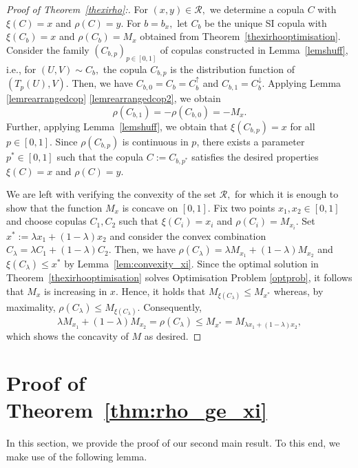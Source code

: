 \documentclass{article}
\theoremstyle{plain}
\theoremstyle{definition}
\begin{document}
\begin{proof}[Proof of Theorem~\ref{thexirho}:]
For \((x,y)\in \mathcal{R},\) we determine a copula \(C\) with \(\xi(C) = x\) and \(\rho(C) = y.\)
For \(b = b_x,\) let \(C_{b}\) be the unique SI copula with \(\xi(C_b) =  x\) and \(\rho(C_b) = M_x\) obtained from Theorem~\ref{thexirhooptimisation}.
Consider the family \((C_{b,p})_{p\in [0,1]}\) of copulas constructed in Lemma~\ref{lemshuff}, i.e., for \((U,V)\sim C_b,\) the copula \(C_{b,p}\) is the distribution function of \((T_p(U),V).\)
Then, we have \(C_{b,0} = C_b = C_b^\uparrow\) and \(C_{b,1} = C_b^\downarrow.\) Applying Lemma \ref{lemrearrangedcop} \ref{lemrearrangedcop2}, we obtain
\[
\rho(C_{b,1})  = -\rho(C_{b,0}) = - M_x.
\]
Further, applying Lemma~\ref{lemshuff}, we obtain that \(\xi(C_{b,p}) = x\) for all \(p\in [0,1].\)
Since \(\rho(C_{b,p})\) is continuous in \(p\), there exists a parameter \(p^*\in [0,1]\) such that the copula \(C:= C_{b,p^*}\) satisfies the desired properties \(\xi(C) = x\) and \(\rho(C) = y.\)

We are left with verifying the convexity of the set \(\mathcal{R},\) for which it is enough to show that the function $M_x$ is concave on \([0,1].\)
Fix two points \(x_1,x_2\in[0,1]\) and choose copulas \(C_1,C_2\) such that \(\xi(C_i)=x_i\) and \(\rho(C_i)=M_{x_i}.\)
Set \(x^\ast:=\lambda x_1+(1-\lambda)x_2\) and consider the convex combination \(C_\lambda=\lambda C_1+(1-\lambda)C_2.\)
Then, we have
\(
  \rho(C_\lambda)
  =\lambda M_{x_1}+(1-\lambda)M_{x_2}
\)
and
\(
  \xi(C_\lambda)
  \le x^\ast
\)
by Lemma~\ref{lem:convexity_xi}.
Since the optimal solution in Theorem~\ref{thexirhooptimisation} solves Optimisation Problem \ref{optprob}, it follows that $M_x$ is increasing in \(x.\) Hence, it holds that \(M_{\xi(C_\lambda)}\le M_{x^\ast}\) whereas, by maximality, \(\rho(C_\lambda)\le M_{\xi(C_\lambda)}.\)
Consequently,
\[
   \lambda M_{x_1}+(1-\lambda)M_{x_2}
   =\rho(C_\lambda)
   \le M_{x^\ast}
   =M_{\lambda x_1+(1-\lambda)x_2}, 
\]
which shows the concavity of $M$ as desired.
\end{proof}

\section{Proof of Theorem~\ref{thm:rho_ge_xi}}\label{sec6}

In this section, we provide the proof of our second main result. %
To this end, we make use of the following lemma.
\end{document}
